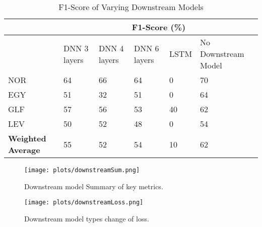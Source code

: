 \begin{table}[h!]
    \centering
    \caption{F1-Score of Varying Downstream Models}\label{tab:f1scoredown}
    \begin{tabular}{|l|l|l|l|l|l|} 
    \hline
                              & \multicolumn{5}{c|}{\textbf{F1-Score (\%)}}                              \\ 
    \hline
                              & DNN 3 layers & DNN 4 layers & DNN 6 layers & LSTM & No Downstream Model  \\ 
    \hline
    NOR                       & 64           & 66           & 64           & 0    & 70                   \\ 
    \hline
    EGY                       & 51           & 32           & 51           & 0    & 64                   \\ 
    \hline
    GLF                       & 57           & 56           & 53           & 40   & 62                   \\ 
    \hline
    LEV                       & 50           & 52           & 48           & 0    & 54                   \\ 
    \hline
    \textbf{Weighted Average} & 55           & 52           & 54           & 10   & 62                   \\
    \hline
    \end{tabular}
\end{table}

\begin{figure}[h!]
    \centering
    \texttt{[image: plots/downstreamSum.png]}
    \caption{Downstream model Summary of key metrics.}
    \label{fig:downSum}
\end{figure}

\begin{figure}[h!]
    \centering
    \texttt{[image: plots/downstreamLoss.png]}
    \caption{Downstream model types change of loss.}
    \label{fig:downLoss}
\end{figure}

